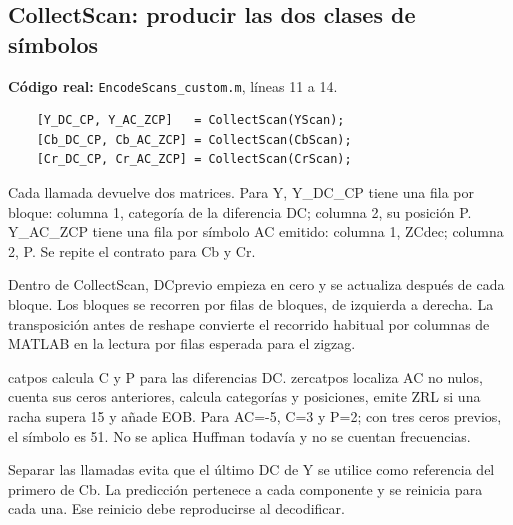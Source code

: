\documentclass[11pt,a4paper,oneside]{report}
\begin{document}
\par\medskip\noindent\begin{minipage}{\linewidth}

\subsection{CollectScan: producir las dos clases de símbolos}

\textbf{Código real:} \texttt{EncodeScans\_custom.m}, líneas 11 a 14.

\begin{lstlisting}[firstnumber=11]
    % Preparar los simbolos DC y AC de cada componente.
    [Y_DC_CP, Y_AC_ZCP]   = CollectScan(YScan);
    [Cb_DC_CP, Cb_AC_ZCP] = CollectScan(CbScan);
    [Cr_DC_CP, Cr_AC_ZCP] = CollectScan(CrScan);
\end{lstlisting}

\end{minipage}\par


Cada llamada devuelve dos matrices. Para Y, Y\_DC\_CP tiene una fila por
bloque: columna 1, categoría de la diferencia DC; columna 2, su posición P.
Y\_AC\_ZCP tiene una fila por símbolo AC emitido: columna 1, ZCdec; columna 2, P.
Se repite el contrato para Cb y Cr.

Dentro de CollectScan, DCprevio empieza en cero y se actualiza después de
cada bloque. Los bloques se recorren por filas de bloques, de izquierda a
derecha. La transposición antes de reshape convierte el recorrido habitual
por columnas de MATLAB en la lectura por filas esperada para el zigzag.

catpos calcula C y P para las diferencias DC. zercatpos localiza AC no nulos,
cuenta sus ceros anteriores, calcula categorías y posiciones, emite ZRL si
una racha supera 15 y añade EOB. Para AC=-5, C=3 y P=2; con tres ceros previos,
el símbolo es 51. No se aplica Huffman todavía y no se cuentan frecuencias.

Separar las llamadas evita que el último DC de Y se utilice como referencia
del primero de Cb. La predicción pertenece a cada componente y se reinicia
para cada una. Ese reinicio debe reproducirse al decodificar.
\end{document}
